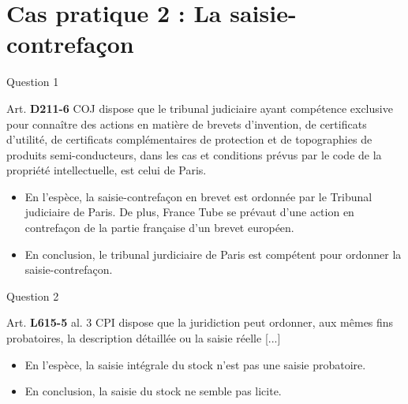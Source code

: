 
\section[Cas 2]{Cas pratique 2 : La saisie-contrefaçon}

\begin{frame}{Question 1}

\begin{block}{}
Art. \textbf{D211-6} COJ dispose que le tribunal judiciaire ayant compétence exclusive pour connaître des actions en matière de brevets d'invention, de certificats d'utilité, de certificats complémentaires de protection et de topographies de produits semi-conducteurs, dans les cas et conditions prévus par le code de la propriété intellectuelle, est celui de Paris.
\end{block}

\begin{itemize}
  \item En l'espèce, la saisie-contrefaçon en brevet est ordonnée par le Tribunal judiciaire de Paris.
  De plus, France Tube se prévaut d'une action en contrefaçon de la partie française d'un brevet européen.
  \item En conclusion, le tribunal jurdiciaire de Paris est compétent pour ordonner la saisie-contrefaçon.
\end{itemize}

\end{frame}

\begin{frame}{Question 2}

\begin{block}{}
Art. \textbf{L615-5} al. 3 CPI dispose que la juridiction peut ordonner, aux mêmes fins probatoires, la description détaillée ou la saisie réelle 
[...]
\end{block}

\begin{itemize}
  \item En l'espèce, la saisie intégrale du stock n'est pas une saisie probatoire.
  \item En conclusion, la saisie du stock ne semble pas licite.
\end{itemize}

\end{frame}

